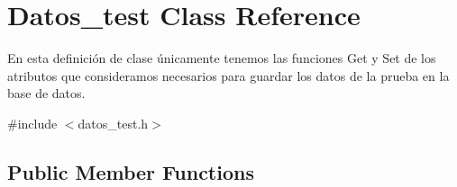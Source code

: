 \hypertarget{class_datos__test}{}\section{Datos\+\_\+test Class Reference}
\label{class_datos__test}


En esta definición de clase únicamente tenemos las funciones Get y Set de los atributos que consideramos necesarios para guardar los datos de la prueba en la base de datos.  




{\ttfamily \#include $<$datos\+\_\+test.\+h$>$}

\subsection*{Public Member Functions}
